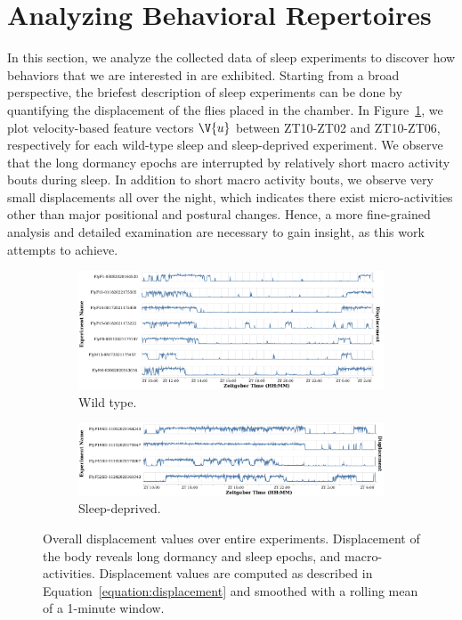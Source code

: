 \section{Analyzing Behavioral Repertoires}\label{section:analyzing-behavioral-repertoires}
In this section, we analyze the collected data of sleep experiments to discover how behaviors that we are interested in are exhibited.
Starting from a broad perspective, the briefest description of sleep experiments can be done by quantifying the displacement of the flies placed in the chamber.
In Figure~\ref{figure:displacement}, we plot velocity-based feature vectors $\V{u}$ between ZT10-ZT02 and ZT10-ZT06, respectively for each wild-type sleep and sleep-deprived experiment.
We observe that the long dormancy epochs are interrupted by relatively short macro activity bouts during sleep.
In addition to short macro activity bouts, we observe very small displacements all over the night, which indicates there exist micro-activities other than major positional and postural changes.
Hence, a more fine-grained analysis and detailed examination are necessary to gain insight, as this work attempts to achieve.

\begin{figure}[htb!]
	\centering
	\begin{subfigure}[b]{0.995\linewidth}
		\centering\includegraphics[width=\linewidth]{figures/Velocity-WT-1T.pdf}
		\caption{Wild type.}
	\end{subfigure}%

	\begin{subfigure}[b]{0.995\linewidth}
		\centering\includegraphics[width=\linewidth]{figures/Velocity-SD-1T.pdf}
		\caption{Sleep-deprived.}
	\end{subfigure}%
	\caption[Overall displacement values over entire experiments.]{Overall displacement values over entire experiments.
		Displacement of the body reveals long dormancy and sleep epochs, and macro-activities.
		Displacement values are computed as described in Equation~\ref{equation:displacement} and smoothed with a rolling mean of a 1-minute window.\label{figure:displacement}}
\end{figure}

